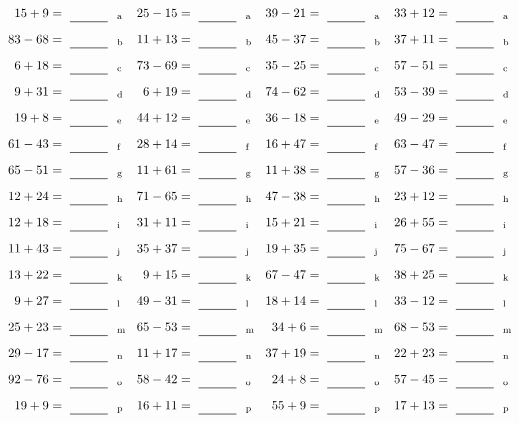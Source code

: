 \documentclass
[
  draft    = true,
  fontsize = 11pt,
  parskip  = half-
]
{scrartcl}
\begin{document}
\clearpage
\begin{align*}
    \pline{15+9}&=\rline{a}
  & \pline{25-15}&=\rline{a}
  & \pline{39-21}&=\rline{a}
  & \pline{33+12}&=\rline{a} \\[1ex]
    \pline{83-68}&=\rline{b}
  & \pline{11+13}&=\rline{b}
  & \pline{45-37}&=\rline{b}
  & \pline{37+11}&=\rline{b} \\[1ex]
    \pline{6+18}&=\rline{c}
  & \pline{73-69}&=\rline{c}
  & \pline{35-25}&=\rline{c}
  & \pline{57-51}&=\rline{c} \\[1ex]
    \pline{9+31}&=\rline{d}
  & \pline{6+19}&=\rline{d}
  & \pline{74-62}&=\rline{d}
  & \pline{53-39}&=\rline{d} \\[1ex]
    \pline{19+8}&=\rline{e}
  & \pline{44+12}&=\rline{e}
  & \pline{36-18}&=\rline{e}
  & \pline{49-29}&=\rline{e} \\[1ex]
    \pline{61-43}&=\rline{f}
  & \pline{28+14}&=\rline{f}
  & \pline{16+47}&=\rline{f}
  & \pline{63-47}&=\rline{f} \\[1ex]
    \pline{65-51}&=\rline{g}
  & \pline{11+61}&=\rline{g}
  & \pline{11+38}&=\rline{g}
  & \pline{57-36}&=\rline{g} \\[1ex]
    \pline{12+24}&=\rline{h}
  & \pline{71-65}&=\rline{h}
  & \pline{47-38}&=\rline{h}
  & \pline{23+12}&=\rline{h} \\[1ex]
    \pline{12+18}&=\rline{i}
  & \pline{31+11}&=\rline{i}
  & \pline{15+21}&=\rline{i}
  & \pline{26+55}&=\rline{i} \\[1ex]
    \pline{11+43}&=\rline{j}
  & \pline{35+37}&=\rline{j}
  & \pline{19+35}&=\rline{j}
  & \pline{75-67}&=\rline{j} \\[1ex]
    \pline{13+22}&=\rline{k}
  & \pline{9+15}&=\rline{k}
  & \pline{67-47}&=\rline{k}
  & \pline{38+25}&=\rline{k} \\[1ex]
    \pline{9+27}&=\rline{l}
  & \pline{49-31}&=\rline{l}
  & \pline{18+14}&=\rline{l}
  & \pline{33-12}&=\rline{l} \\[1ex]
    \pline{25+23}&=\rline{m}
  & \pline{65-53}&=\rline{m}
  & \pline{34+6}&=\rline{m}
  & \pline{68-53}&=\rline{m} \\[1ex]
    \pline{29-17}&=\rline{n}
  & \pline{11+17}&=\rline{n}
  & \pline{37+19}&=\rline{n}
  & \pline{22+23}&=\rline{n} \\[1ex]
    \pline{92-76}&=\rline{o}
  & \pline{58-42}&=\rline{o}
  & \pline{24+8}&=\rline{o}
  & \pline{57-45}&=\rline{o} \\[1ex]
    \pline{19+9}&=\rline{p}
  & \pline{16+11}&=\rline{p}
  & \pline{55+9}&=\rline{p}
  & \pline{17+13}&=\rline{p}
\end{align*}
\end{document}
